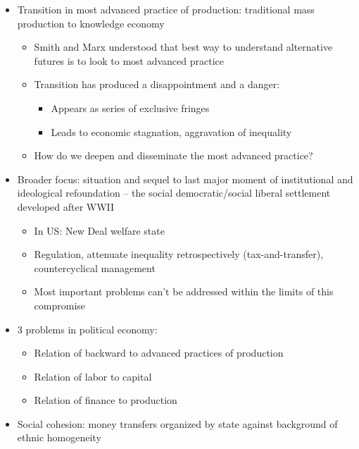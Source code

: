 \begin{itemize}
\tightlist
\item
  Transition in most advanced practice of production: traditional mass
  production to knowledge economy

  \begin{itemize}
  \tightlist
  \item
    Smith and Marx understood that best way to understand alternative
    futures is to look to most advanced practice
  \item
    Transition has produced a disappointment and a danger:

    \begin{itemize}
    \tightlist
    \item
      Appears as series of exclusive fringes
    \item
      Leads to economic stagnation, aggravation of inequality
    \end{itemize}
  \item
    How do we deepen and disseminate the most advanced practice?
  \end{itemize}
\item
  Broader focus: situation and sequel to last major moment of
  institutional and ideological refoundation -- the social
  democratic/social liberal settlement developed after WWII

  \begin{itemize}
  \tightlist
  \item
    In US: New Deal welfare state
  \item
    Regulation, attenuate inequality retrospectively (tax-and-transfer),
    countercyclical management
  \item
    Most important problems can't be addressed within the limits of this
    compromise
  \end{itemize}
\item
  3 problems in political economy:

  \begin{itemize}
  \tightlist
  \item
    Relation of backward to advanced practices of production
  \item
    Relation of labor to capital
  \item
    Relation of finance to production
  \end{itemize}
\item
  Social cohesion: money transfers organized by state against background
  of ethnic homogeneity


\end{itemize}

